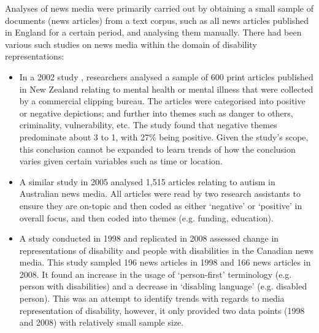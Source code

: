 \documentclass{report}
\begin{document}
Analyses of news media were primarily carried out by obtaining a small sample of documents (news articles) from a text corpus, such as all news articles published in England for a certain period, and analysing them manually. There had been various such studies on news media within the domain of disability representations:
\begin{itemize}
	\item In a 2002 study \cite{coverdale2002depictions}, researchers analysed a sample of 600 print articles published in New Zealand relating to mental health or mental illness that were collected by a commercial clipping bureau.
		The articles were categorised into positive or negative depictions; and further into themes such as danger to others, criminality, vulnerability, etc.
		The study found that negative themes predominate about 3 to 1, with 27\% being positive.
		Given the study's scope, this conclusion cannot be expanded to learn trends of how the conclusion varies given certain variables such as time or location.
	\item A similar study in 2005 \cite{jones2009representations} analysed 1,515 articles relating to autism in Australian news media.
		All articles were read by two research assistants to ensure they are on-topic and then coded as either `negative' or `positive' in overall focus, and then coded into themes (e.g. funding, education).
	\item A study conducted in 1998 \cite{gold1999media} and replicated in 2008 \cite{devotta2013representations} assessed change in representations of disability and people with disabilities in the Canadian news media.
		This study sampled 196 news articles in 1998 and 166 news articles in 2008.
		It found an increase in the usage of `person-first' terminology (e.g. person with disabilities) and a decrease in `disabling language' (e.g. disabled person). %
		This was an attempt to identify trends with regards to media representation of disability, however, it only provided two data points (1998 and 2008) with relatively small sample size.
\end{itemize}
\end{document}
